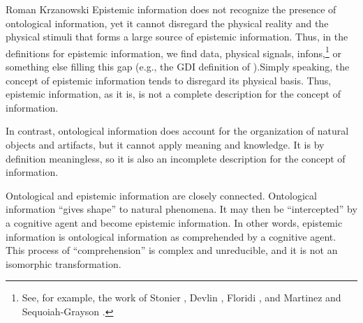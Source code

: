 \begin{artengenv}{Roman Krzanowski}
Epistemic information does not recognize the presence of ontological information, yet it cannot disregard the physical reality and the physical stimuli that forms a large source of epistemic information. Thus, in the definitions for epistemic information, we find data, physical signals, infons,\footnote{See, for example, the work of Stonier
\parencite*[][]{stonier_information_1990}, %
 Devlin 
\parencite*[][]{devlin_logic_1991}, %
 Floridi 
\parencite*[][]{floridi_philosophy_2010}, %
 and Martinez and Sequoiah-Grayson 
\parencite*[][]{martinez_logic_2016}. %
} or something else filling this gap (e.g., the GDI definition of 
\parencite[][]{floridi_philosophy_2010}%
).Simply speaking, the concept of epistemic information tends to disregard its physical basis. Thus, epistemic information, as it is, is not a complete description for the concept of information.

In contrast, ontological information does account for the organization of natural objects and artifacts, but it cannot apply meaning and knowledge. It is by definition meaningless, so it is also an incomplete description for the concept of information.

Ontological and epistemic information are closely connected. Ontological information ``gives shape'' to natural phenomena. It may then be ``intercepted'' by a cognitive agent and become epistemic information. In other words, epistemic information is ontological information as comprehended by a cognitive agent. This process of ``comprehension'' is complex and unreducible, and it is not an isomorphic transformation.


\end{artengenv}
